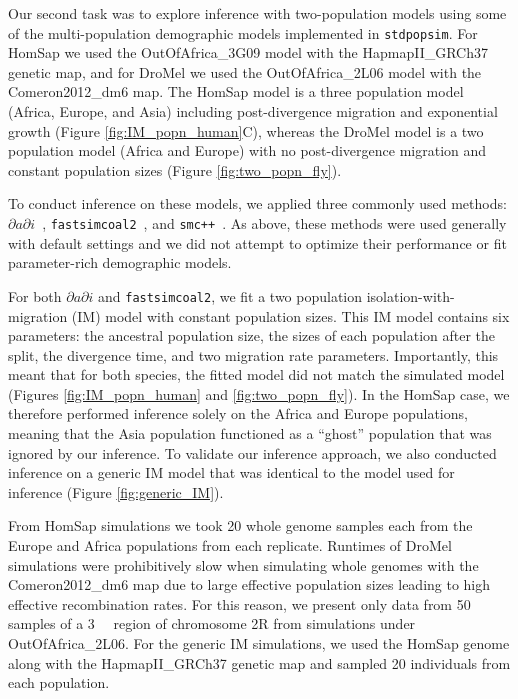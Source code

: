 \documentclass[12pt,halfline,a4paper]{ouparticle}
\newcommand{\stdpopsim}{\texttt{stdpopsim}\xspace}
\newcommand{\dadi}{$\partial a \partial i$\xspace}
\newcommand{\smcpp}{\texttt{smc++}\xspace}
\newcommand{\fastsimcoal}{\texttt{fastsimcoal2}\xspace}
\begin{document}
Our second task was to explore inference with two-population models
using some of the multi-population demographic models implemented in \stdpopsim.
For HomSap we used the OutOfAfrica\_3G09 model with the HapmapII\_GRCh37 genetic map,
and for DroMel we used the OutOfAfrica\_2L06 model with the Comeron2012\_dm6 map.
The HomSap model is a three population model (Africa, Europe, and Asia) including post-divergence
migration and exponential growth (Figure \ref{fig:IM_popn_human}C), whereas the
DroMel model is a two population model (Africa and Europe) with no post-divergence
migration and constant population sizes (Figure \ref{fig:two_popn_fly}).

To conduct inference on these models, we applied three commonly used methods:
\dadi~\citep{gutenkunst2009inferring}, \fastsimcoal~\citep{excoffier2013robust},
and \smcpp~\citep{terhorst2017robust}. As above, these methods were used
generally with default settings and we did not attempt to optimize their performance or fit
parameter-rich demographic models.

For both \dadi and \fastsimcoal, we fit a two population
isolation-with-migration (IM) model with constant population sizes.
This IM model contains six parameters:
the ancestral population size, the sizes of each population after the split,
the divergence time, and two migration rate parameters.
Importantly, this meant that for both species, the
fitted model did not match the simulated model (Figures \ref{fig:IM_popn_human} and \ref{fig:two_popn_fly}).
In the HomSap case, we therefore performed inference solely on the Africa
and Europe populations, meaning that the Asia population functioned as a ``ghost''
population that was ignored by our inference.
To validate our inference approach, we also conducted
inference on a generic IM model that was identical to the model used for inference (Figure \ref{fig:generic_IM}).

From HomSap simulations we took 20 whole genome samples each from the Europe and Africa populations
from each replicate.
Runtimes of DroMel simulations were prohibitively slow when simulating whole genomes
with the Comeron2012\_dm6 map due to large effective population sizes leading to
high effective recombination rates. For this reason, we present only data
from 50 samples of a \SI{3}{\mega\byte} region of chromosome 2R from simulations under OutOfAfrica\_2L06.
For the generic IM simulations, we used the HomSap genome along with the
HapmapII\_GRCh37 genetic map and sampled 20 individuals from each population.
\end{document}
